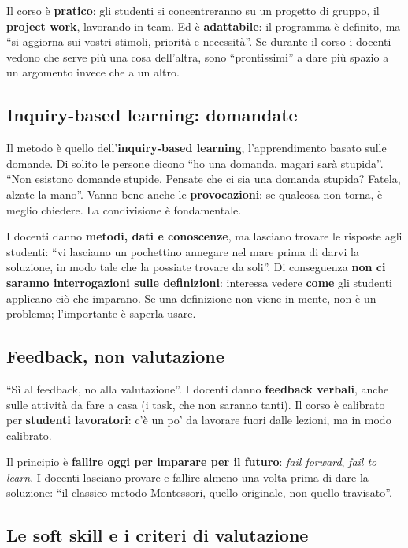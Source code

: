 Il corso è \textbf{pratico}: gli studenti si concentreranno su un progetto di
gruppo, il \textbf{project work}, lavorando in team. Ed è \textbf{adattabile}: il
programma è definito, ma ``si aggiorna sui vostri stimoli, priorità e
necessità''. Se durante il corso i docenti vedono che serve più una cosa
dell'altra, sono ``prontissimi'' a dare più spazio a un argomento invece che a
un altro.

\subsection{Inquiry-based learning: domandate}

Il metodo è quello dell'\textbf{inquiry-based learning}, l'apprendimento basato
sulle domande. Di solito le persone dicono ``ho una domanda, magari sarà
stupida''. ``Non esistono domande stupide. Pensate che ci sia una domanda
stupida? Fatela, alzate la mano''. Vanno bene anche le
\textbf{provocazioni}: se qualcosa non torna, è meglio chiedere. La condivisione
è fondamentale.

I docenti danno \textbf{metodi, dati e conoscenze}, ma lasciano trovare le
risposte agli studenti: ``vi lasciamo un pochettino annegare nel mare prima di
darvi la soluzione, in modo tale che la possiate trovare da soli''. Di
conseguenza \textbf{non ci saranno interrogazioni sulle definizioni}: interessa
vedere \textbf{come} gli studenti applicano ciò che imparano. Se una
definizione non viene in mente, non è un problema; l'importante è saperla usare.

\subsection{Feedback, non valutazione}

``Sì al feedback, no alla valutazione''. I docenti danno \textbf{feedback
verbali}, anche sulle attività da fare a casa (i task, che non saranno tanti).
Il corso è calibrato per \textbf{studenti lavoratori}: c'è un po' da lavorare
fuori dalle lezioni, ma in modo calibrato.

Il principio è \textbf{fallire oggi per imparare per il futuro}: \emph{fail
forward}, \emph{fail to learn}. I docenti lasciano provare e fallire almeno una
volta prima di dare la soluzione: ``il classico metodo Montessori, quello
originale, non quello travisato''.

\subsection{Le soft skill e i criteri di valutazione}

